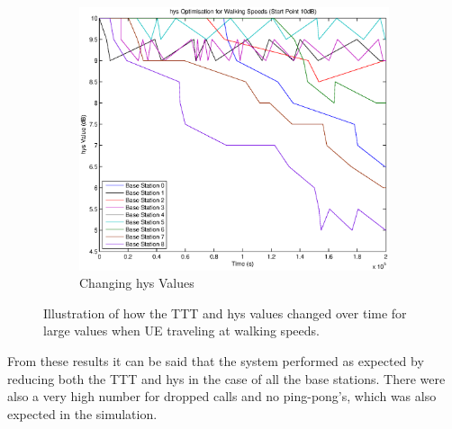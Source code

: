 \begin{figure}[H]
\begin{subfigure}[b]{0.49\textwidth}
                \includegraphics[width=\textwidth]{figures/walking_figures/high/long_hys.eps}
                \caption{Changing hys Values}
                \label{fig:walk_high_hys}
        \end{subfigure}
        \caption{Illustration of how the TTT and hys values changed over time for large values when UE traveling at walking speeds.}\label{fig:walk_high_ttthys}
\end{figure}
From these results it can be said that the system performed as expected by reducing both the TTT and hys in the case of all the base stations. There were also a very high number for dropped calls and no ping-pong's, which was also expected in the simulation.
